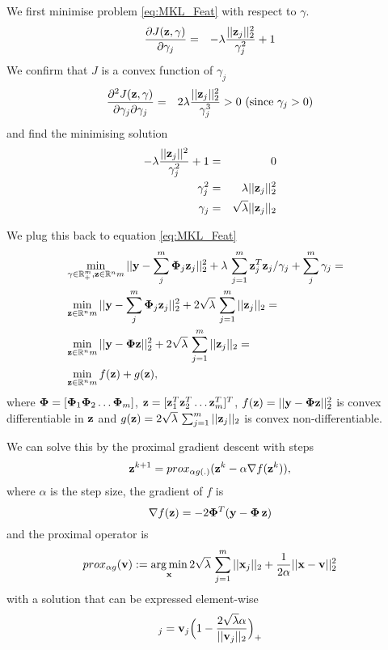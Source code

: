 We first minimise problem \eqref{eq:MKL_Feat} with respect to $\gamma$.
\begin{eqnarray}
\frac{\partial J(\mathbf{z},\mathbf{\gamma})}{\partial \gamma_j}
& = & - \lambda \frac{||\mathbf{z}_j||_2^2}{\gamma_j^2} + 1
\end{eqnarray}
We confirm that $J$ is a convex function of $\gamma_j$
\begin{eqnarray}
\frac{\partial^2 J(\vc{z},\vc{\gamma})}{\partial \gamma_j \partial \gamma_j}
& = & 2 \lambda \frac{||\vc{z}_j||_2^2}{\gamma_j^3} > 0 \ (\text{since } \gamma_j > 0)
\end{eqnarray}
and find the minimising solution 
\begin{eqnarray}
- \lambda \frac{||\mathbf{z}_j||^2}{\gamma_j^2} + 1 & = & 0 \nonumber \\
\gamma_j^2 & = & \lambda ||\mathbf{z}_j||_2^2 \nonumber \\
\gamma_j & = & \sqrt{\lambda} ||\mathbf{z}_j||_2
\end{eqnarray}

We plug this back to equation \eqref{eq:MKL_Feat}
\begin{eqnarray}\label{eq:MKL_GL}
& \min_{\gamma \in \mathbb{R}^m_+, \mathbf{z} \in \mathbb{R}^nm} 
||\mathbf{y} - \sum_{j}^m \mathbf{\Phi}_j \mathbf{z}_j||_2^2 +
\lambda \, \sum_{j=1}^m \mathbf{z}_j^T \mathbf{z}_j / \gamma_j
+ \sum_{j}^m \gamma_j = & \nonumber \\
& \min_{\mathbf{z} \in \mathbb{R}^nm} 
||\mathbf{y} - \sum_{j}^m \mathbf{\Phi}_j \mathbf{z}_j||_2^2 +
2 \sqrt{\lambda} \, \sum_{j=1}^m ||\mathbf{z}_j||_2 = & \nonumber \\
& \min_{\mathbf{z} \in \mathbb{R}^nm} 
||\mathbf{y} - \mathbf{\Phi} \mathbf{z} ||_2^2 +
2 \sqrt{\lambda} \, \sum_{j=1}^m ||\mathbf{z}_j||_2 = & \nonumber \\
& \min_{\mathbf{z} \in \mathbb{R}^nm} 
f(\mathbf{z}) + g(\mathbf{z}), &
\end{eqnarray}
where $\mathbf{\Phi} = [\mathbf{\Phi}_1 \mathbf{\Phi}_2 \ldots \mathbf{\Phi}_m] $, 
$\mathbf{z} = [\mathbf{z}^T_1 \mathbf{z}^T_2 \dots \mathbf{z}^T_m]^T$, $f(\mathbf{z}) = ||\mathbf{y} - \mathbf{\Phi} \mathbf{z} ||_2^2$ is convex differentiable in $\mathbf{z}$ and $g(\mathbf{z}) = 2 \sqrt{\lambda} \, \sum_{j=1}^m ||\mathbf{z}_j||_2$ is convex non-differentiable.

We can solve this by the proximal gradient descent with steps
\begin{equation}
\mathbf{z}^{k+1} = prox_{\alpha g(.)}( \mathbf{z}^{k} - \alpha \nabla f(\mathbf{z}^{k})),
\end{equation}
where $\alpha$ is the step size, the gradient of $f$ is
\begin{equation}
\nabla f(\mathbf{z}) = - 2 \mathbf{\Phi}^T (\mathbf{y} - \mathbf{\Phi} \, \mathbf{z})
\end{equation}
and the proximal operator is
\begin{equation}
prox_{\alpha g}( \mathbf{v} ) := \operatorname*{arg\,min}_{\mathbf{x}} 2 \sqrt{\lambda} \, \sum_{j=1}^m ||\mathbf{x}_j||_2 + \frac{1}{2\alpha}||\mathbf{x}-\mathbf{v}||_2^2
\end{equation}
with a solution that can be expressed element-wise
\begin{equation}
[ prox_{\alpha g}( \vc{v} ) ]_j = \vc{v}_j \Big( 1 - \frac{2 \sqrt{\lambda} \alpha}{||\vc{v}_j||_2} \Big)_+
\end{equation}

